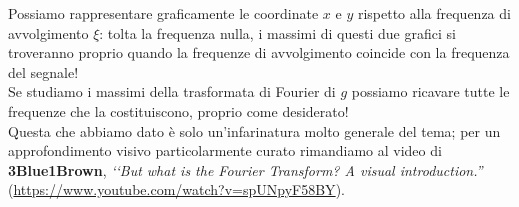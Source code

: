 Possiamo rappresentare graficamente le coordinate $x$ e $y$ rispetto alla frequenza di avvolgimento $\xi$: tolta la frequenza nulla, i massimi di questi due grafici si troveranno proprio quando la frequenze di avvolgimento coincide con la frequenza del segnale!\\
Se studiamo i massimi della trasformata di Fourier di $g$ possiamo ricavare tutte le frequenze che la costituiscono, proprio come desiderato!\\
Questa che abbiamo dato è solo un'infarinatura molto generale del tema; per un approfondimento visivo particolarmente curato rimandiamo al video di \textbf{3Blue1Brown}, 	\textit{‘‘But what is the Fourier Transform?  A visual introduction.''} (\textcolor{redill}{\url{https://www.youtube.com/watch?v=spUNpyF58BY}}).
